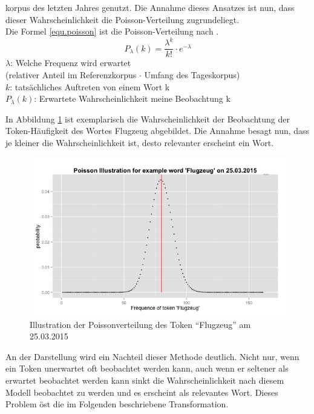 korpus des letzten Jahres genutzt. Die Annahme dieses Ansatzes ist nun, dass dieser Wahrscheinlichkeit die Poisson-Verteilung zugrundeliegt.\\
Die Formel \ref{equ.poisson} ist die Poisson-Verteilung nach \cite[S. 338 ff]{heyer06}.
	\begin{equation}\label{equ.poisson}
	P_\lambda(k) = \frac{\lambda^{k}}{k!}  \cdot e^{-\lambda}
	\end{equation}
	$\lambda$: Welche Frequenz wird erwartet \\
	(relativer Anteil im Referenzkorpus $\cdot$ Umfang des Tageskorpus)\\
	$k$: tats\"achliches Auftreten von einem Wort k\\
	$P_\lambda(k)$: Erwartete Wahrscheinlichkeit meine Beobachtung k


In Abbildung \ref{pic.poisson_algemein} ist exemplarisch die Wahrscheinlichkeit der Beobachtung der Token-H\"aufigkeit des Wortes Flugzeug abgebildet. Die Annahme besagt nun, dass je kleiner die Wahrscheinlichkeit
ist, desto relevanter erscheint ein Wort. \\

\begin{figure}[h!]
    \centering
    \includegraphics[width=1\textwidth]{pictures/poissonVerteilungFlugzeug.png}
    \caption{Illustration der Poissonverteilung des Token \enquote{Flugzeug} am 25.03.2015}\label{pic.poisson_algemein}
\end{figure}

An der Darstellung wird ein Nachteil dieser Methode deutlich. Nicht nur, wenn ein Token unerwartet oft beobachtet werden kann, auch wenn er seltener als erwartet beobachtet werden kann sinkt die Wahrscheinlichkeit nach diesem Modell beobachtet zu werden und es erscheint als relevantes Wort. Dieses Problem \"ost die im Folgenden beschriebene Transformation.\\

